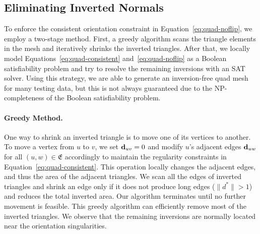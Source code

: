 \subsection{Eliminating Inverted Normals}
\label{sec:quad-flip}
To enforce the consistent orientation constraint in Equation~\eqref{eq:quad-noflip}, we employ a two-stage method.  First, a greedy algorithm scans the triangle elements in the mesh and iteratively shrinks the inverted triangles. After that, we locally model Equations~\eqref{eq:quad-consistent} and~\eqref{eq:quad-noflip} as a Boolean satisfiability problem and try to resolve the remaining inversions with an SAT solver.  Using this strategy, we are able to generate an inversion-free quad mesh for many testing data, but this is not always guaranteed due to the NP-completeness of the Boolean satisfiability problem.

\paragraph*{Greedy Method.}
One way to shrink an inverted triangle is to move one of its vertices to another. To move a vertex from $u$ to $v$, we set ${\mathbf{d}}_{uv}=0$ and modify $u$'s adjacent edges ${\mathbf{d}}_{uw}$ for all $(u,w)\in\mathfrak{E}$ accordingly to maintain the regularity constraints in Equation~\eqref{eq:quad-consistent}.  This operation locally changes the adjacent edges, and thus the area of the adjacent triangles. We scan all the edges of inverted triangles and shrink an edge only if it does not produce long edges ($\|d^*\|>1$) and reduces the total inverted area.  Our algorithm terminates until no further movement is feasible. This greedy algorithm can efficiently remove most of the inverted triangles. We observe that the remaining inversions are normally located near the orientation singularities.

